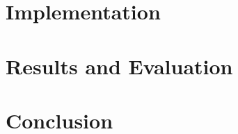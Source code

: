 \documentclass{ucl_thesis}
\begin{document}
\chapter{Implementation} %
\label{implementation}





\chapter{Results and Evaluation}
\label{results}








\chapter{Conclusion}
\label{chp:conc}






%

\end{document}
